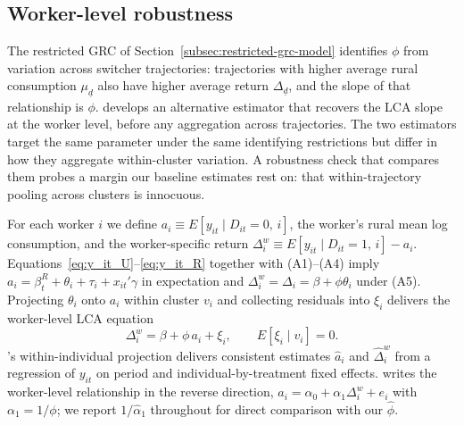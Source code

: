 %

\subsection{Worker-level robustness}\label{subsec:verdier-robustness}

The restricted GRC of Section~\ref{subsec:restricted-grc-model} identifies $\phi$ from variation across switcher trajectories: trajectories with higher average rural consumption $\mu_{\underline d}$ also have higher average return $\Delta_{\underline d}$, and the slope of that relationship is $\phi$.
\citet{verdierAverageTreatmentEffects2020a} develops an alternative estimator that recovers the LCA slope at the worker level, before any aggregation across trajectories.
The two estimators target the same parameter under the same identifying restrictions but differ in how they aggregate within-cluster variation.
A robustness check that compares them probes a margin our baseline estimates rest on: that within-trajectory pooling across clusters is innocuous.

For each worker $i$ we define $a_i \equiv E[y_{it}\mid D_{it}=0,\,i]$, the worker's rural mean log consumption, and the worker-specific return $\Delta_i^w \equiv E[y_{it}\mid D_{it}=1,\,i] - a_i$.
Equations~\eqref{eq:y_it_U}--\eqref{eq:y_it_R} together with (A1)--(A4) imply $a_i = \beta_t^R + \theta_i + \tau_i + x_{it}'\gamma$ in expectation and $\Delta_i^w = \Delta_i = \beta + \phi\theta_i$ under (A5).
Projecting $\theta_i$ onto $a_i$ within cluster $v_i$ and collecting residuals into $\xi_i$ delivers the worker-level LCA equation
\begin{equation}\label{eq:worker-lca}
\Delta_i^w = \beta + \phi\, a_i + \xi_i, \qquad E[\xi_i \mid v_i] = 0.
\end{equation}
\citet{chamberlain1984panel}'s within-individual projection delivers consistent estimates $\hat a_i$ and $\hat\Delta_i^w$ from a regression of $y_{it}$ on period and individual-by-treatment fixed effects.
\citet{verdierAverageTreatmentEffects2020a} writes the worker-level relationship in the reverse direction, $a_i = \alpha_0 + \alpha_1 \Delta_i^w + e_i$ with $\alpha_1 = 1/\phi$; we report $1/\hat\alpha_1$ throughout for direct comparison with our $\hat\phi$.

